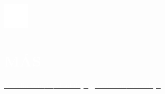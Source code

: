 \documentclass[../main.tex]{subfiles}
\begin{document}
    \hspace*{0.4cm}
    \begin{minipage}[t]{1.75cm}
        \vspace*{1cm}\includegraphics[width=1.25cm]{assets/more.png}
    \end{minipage}
    \begin{minipage}[t]{5cm}

        \vspace*{0.75cm}
        \section*{\textcolor{white}{MÁS}}
        \vspace*{-0.25cm}
        \textcolor{white}{
            \vspace*{0.1cm}\underline{\href{https://www.linkedin.com/in/albatalaya}{\textcolor{white}{linkedin.com/in/albatalaya}}}
            \underline{\href{https://www.github.com/albatalaya}{\textcolor{white}{github.com/albatalaya}}}
        }
    \end{minipage}
\end{document}
